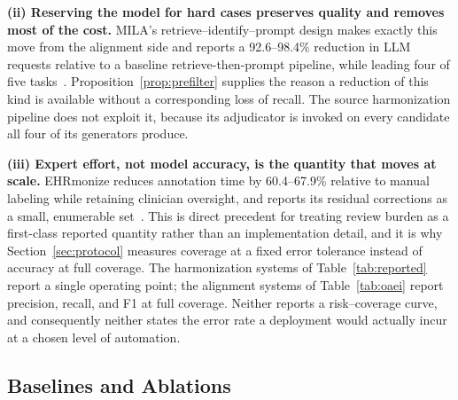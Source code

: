 \documentclass[conference]{IEEEtran}
\begin{document}
\textbf{(ii) Reserving the model for hard cases preserves quality and removes most of the cost.} MILA's retrieve--identify--prompt design makes exactly this move from the alignment side and reports a 92.6--98.4\% reduction in LLM requests relative to a baseline retrieve-then-prompt pipeline, while leading four of five tasks~\cite{b54}. Proposition~\ref{prop:prefilter} supplies the reason a reduction of this kind is available without a corresponding loss of recall. The source harmonization pipeline does not exploit it, because its adjudicator is invoked on every candidate all four of its generators produce.

\textbf{(iii) Expert effort, not model accuracy, is the quantity that moves at scale.} EHRmonize reduces annotation time by 60.4--67.9\% relative to manual labeling while retaining clinician oversight, and reports its residual corrections as a small, enumerable set~\cite{b40}. This is direct precedent for treating review burden as a first-class reported quantity rather than an implementation detail, and it is why Section~\ref{sec:protocol} measures coverage at a fixed error tolerance instead of accuracy at full coverage. The harmonization systems of Table~\ref{tab:reported} report a single operating point; the alignment systems of Table~\ref{tab:oaei} report precision, recall, and F1 at full coverage. Neither reports a risk--coverage curve, and consequently neither states the error rate a deployment would actually incur at a chosen level of automation.

\subsection{Baselines and Ablations}
\end{document}
